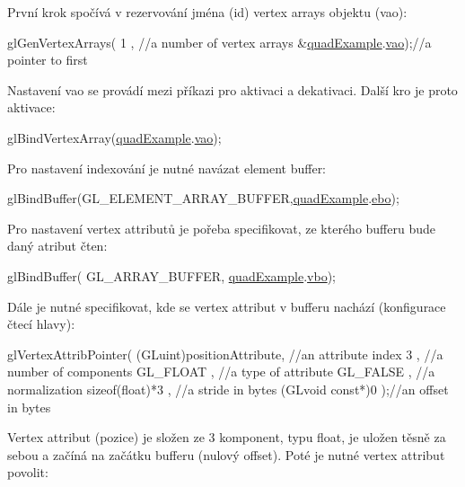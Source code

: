 První krok spočívá v rezervování jména (id) vertex arrays objektu (vao)\-: 
\begin{DoxyCodeInclude}
  glGenVertexArrays(
      1               , \textcolor{comment}{//a number of vertex arrays}
      &\hyperlink{quadExample_8c_ad961415145a9c30bd9846d4a278cc63a}{quadExample}.\hyperlink{structQuadExampleVariables_a294c388653d62435d7eeb7994f45c4fc}{vao});\textcolor{comment}{//a pointer to first }
\end{DoxyCodeInclude}
Nastavení vao se provádí mezi příkazi pro aktivaci a dekativaci. Další kro je proto aktivace\-: 
\begin{DoxyCodeInclude}
  glBindVertexArray(\hyperlink{quadExample_8c_ad961415145a9c30bd9846d4a278cc63a}{quadExample}.\hyperlink{structQuadExampleVariables_a294c388653d62435d7eeb7994f45c4fc}{vao});
\end{DoxyCodeInclude}
Pro nastavení indexování je nutné navázat element buffer\-: 
\begin{DoxyCodeInclude}
  glBindBuffer(GL\_ELEMENT\_ARRAY\_BUFFER,\hyperlink{quadExample_8c_ad961415145a9c30bd9846d4a278cc63a}{quadExample}.\hyperlink{structQuadExampleVariables_a3b1abdb0f18593a0ebec8dd9a222164b}{ebo});
\end{DoxyCodeInclude}
Pro nastavení vertex attributů je pořeba specifikovat, ze kterého bufferu bude daný atribut čten\-: 
\begin{DoxyCodeInclude}
  glBindBuffer(
      GL\_ARRAY\_BUFFER,
      \hyperlink{quadExample_8c_ad961415145a9c30bd9846d4a278cc63a}{quadExample}.\hyperlink{structQuadExampleVariables_a69515fd546272c117e14f784221f6412}{vbo});
\end{DoxyCodeInclude}
Dále je nutné specifikovat, kde se vertex attribut v bufferu nachází (konfigurace čtecí hlavy)\-: 
\begin{DoxyCodeInclude}
  glVertexAttribPointer(
      (GLuint)positionAttribute, \textcolor{comment}{//an attribute index}
      3                        , \textcolor{comment}{//a number of components}
      GL\_FLOAT                 , \textcolor{comment}{//a type of attribute}
      GL\_FALSE                 , \textcolor{comment}{//a normalization}
      \textcolor{keyword}{sizeof}(\textcolor{keywordtype}{float})*3          , \textcolor{comment}{//a stride in bytes}
      (GLvoid \textcolor{keyword}{const}*)0         );\textcolor{comment}{//an offset in bytes}
\end{DoxyCodeInclude}
Vertex attribut (pozice) je složen ze 3 komponent, typu float, je uložen těsně za sebou a začíná na začátku bufferu (nulový offset). Poté je nutné vertex attribut povolit\-: 
